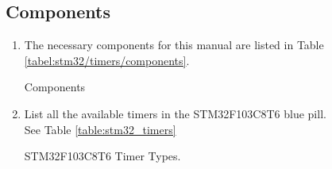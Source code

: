 \documentclass[journal,12pt,twocolumn]{IEEEtran}
\renewcommand\thesection{\arabic{section}}
\renewcommand\thesubsection{\thesection.\arabic{subsection}}
\begin{document}
\subsection{Components}
\renewcommand{\theequation}{\theenumi}
\renewcommand{\thefigure}{\theenumi}
\begin{enumerate}[label=\thesubsection.\arabic*.,ref=\thesubsection.\theenumi]
\item The necessary components for this manual are listed in Table \ref{tabel:stm32/timers/components}.
\begin{table}[!ht]
\begin{center}

\end{center}
\caption{Components}
\label{tabel:stm32/timers/components}
\end{table}
%
\item List all the available timers in the STM32F103C8T6 blue pill.
\\
\solution  See Table \ref{table:stm32_timers}
\begin{table}[!ht]
\centering
\footnotesize

\caption{STM32F103C8T6 Timer Types.}
\label{table:stm32_timers}
\end{table}


\end{enumerate}
\end{document}

